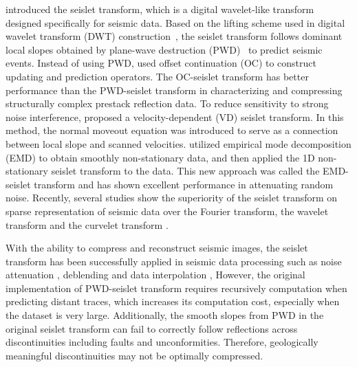     \cite{Fomel2010a} introduced the seislet transform, which is a digital 
    wavelet-like transform designed specifically for seismic data. 
    Based on the lifting scheme used in digital wavelet transform (DWT) 
    construction~\cite[]{Sweldens1995}, the seislet transform follows dominant 
    local slopes obtained by plane-wave destruction (PWD)~\cite[]{Claerbout1992,
    Fomel2002} to predict seismic events. 
    Instead of using PWD, \cite{Liu2010} used offset continuation (OC) to 
    construct updating and prediction operators. 
    The OC-seislet transform has better performance than the PWD-seislet 
    transform in characterizing and compressing structurally complex prestack 
    reflection data. 
    To reduce sensitivity to strong noise interference, \cite{Liu2015} proposed 
    a velocity-dependent (VD) seislet transform. 
    In this method, the normal moveout equation was introduced to serve as a 
    connection between local slope and scanned velocities. 
    \cite{Chen2018} utilized empirical mode decomposition (EMD) to obtain 
    smoothly non-stationary data, and then applied the 1D non-stationary seislet 
    transform to the data. This new approach was called the EMD-seislet 
    transform and has shown excellent performance in attenuating random noise. 
    Recently, several studies show the superiority of the seislet transform
    on sparse representation of seismic data over the Fourier transform, the 
    wavelet transform and the curvelet transform \cite[]{Fomel2010a, Gan2015, 
    Chen2018}.

    With the ability to compress and reconstruct seismic images, the 
    seislet transform has been successfully applied in seismic data processing 
    such as noise attenuation \cite[]{Chen2016a, Chen2016b}, deblending 
    \cite[]{Chen2014, Gan2016} and data interpolation \cite[]{Cai2013, shuwei2016cs}, 
    However, the original implementation of PWD-seislet transform requires
    recursively computation when predicting distant traces, which increases its 
    computation cost, especially when the dataset is very large.
    Additionally, the smooth slopes from PWD in the original seislet transform 
    can fail to correctly follow reflections across discontinuities including 
    faults and unconformities. 
    Therefore, geologically meaningful discontinuities may not be optimally 
    compressed. 

